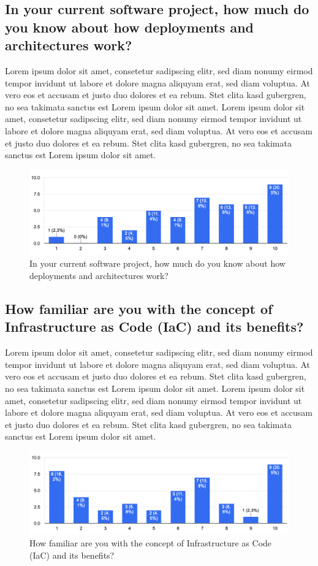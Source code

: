 \subsection{In your current software project, how much do you know about how deployments and architectures work?}
Lorem ipsum dolor sit amet, consetetur sadipscing elitr, sed diam nonumy eirmod tempor invidunt ut labore et dolore magna aliquyam erat, sed diam voluptua. At vero eos et accusam et justo duo dolores et ea rebum. Stet clita kasd gubergren, no sea takimata sanctus est Lorem ipsum dolor sit amet. Lorem ipsum dolor sit amet, consetetur sadipscing elitr, sed diam nonumy eirmod tempor invidunt ut labore et dolore magna aliquyam erat, sed diam voluptua. At vero eos et accusam et justo duo dolores et ea rebum. Stet clita kasd gubergren, no sea takimata sanctus est Lorem ipsum dolor sit amet.
\begin{figure}[h!]
\centering
\includegraphics[width=\linewidth]{Images/Survey/iac_1.png}
\caption{In your current software project, how much do you know about how deployments and architectures work?}
\label{fig:results:iac:1}
\end{figure}


\subsection{How familiar are you with the concept of Infrastructure as Code (IaC) and its benefits?}
Lorem ipsum dolor sit amet, consetetur sadipscing elitr, sed diam nonumy eirmod tempor invidunt ut labore et dolore magna aliquyam erat, sed diam voluptua. At vero eos et accusam et justo duo dolores et ea rebum. Stet clita kasd gubergren, no sea takimata sanctus est Lorem ipsum dolor sit amet. Lorem ipsum dolor sit amet, consetetur sadipscing elitr, sed diam nonumy eirmod tempor invidunt ut labore et dolore magna aliquyam erat, sed diam voluptua. At vero eos et accusam et justo duo dolores et ea rebum. Stet clita kasd gubergren, no sea takimata sanctus est Lorem ipsum dolor sit amet.
\begin{figure}[h!]
\centering
\includegraphics[width=\linewidth]{Images/Survey/iac_2.png}
\caption{How familiar are you with the concept of Infrastructure as Code (IaC) and its benefits?}
\label{fig:results:iac:2}
\end{figure}

